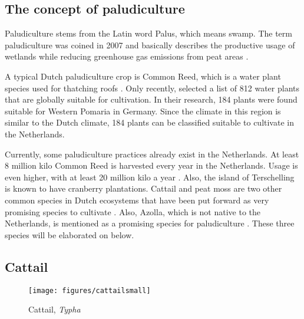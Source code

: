 \documentclass[a4paper,12pt]{scrbook}
\begin{document}
\subsection{The concept of paludiculture}
Paludiculture stems from the Latin word Palus, which means swamp. The term paludiculture was coined in 2007 and basically describes the productive usage of wetlands while reducing greenhouse gas emissions from peat areas \citep{wichtmann2007paludiculture}. 

A typical Dutch paludiculture crop is Common Reed, which is a water plant species used for thatching roofs \citep{wichtmann2016paludiculture}. Only recently, \citet{abel2013database} selected a list of 812 water plants that are globally suitable for cultivation. In their research, 184 plants were found suitable for Western Pomaria in Germany. Since the climate in this region is similar to the Dutch climate, 184 plants can be classified suitable to cultivate in the Netherlands. 

Currently, some paludiculture practices already exist in the Netherlands. At least 8 million kilo Common Reed is harvested every year in the Netherlands. Usage is even higher, with at least 20 million kilo a year \citep{wichtmann2016paludiculture}. Also, the island of Terschelling is known to have cranberry plantations. Cattail and peat moss are two other common species in Dutch ecosystems that have been put forward as very promising species to cultivate \citep{abel2013database, van2013werk}. Also, Azolla, which is not native to the Netherlands, is mentioned as a promising species for paludiculture \citep{abel2013database, van2013werk}. 
These three species will be elaborated on below.

\subsection{Cattail}

\begin{figure}
    \centering
    \texttt{[image: figures/cattailsmall]} 
    \caption{Cattail, \textit{Typha}}
    \label{fig:cattail}
\end{figure}

\end{document}
